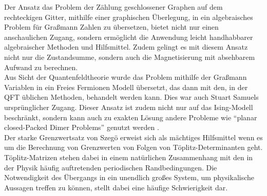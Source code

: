\noindent Der Ansatz das Problem der Zählung geschlossener Graphen auf dem rechteckigen Gitter, mithilfe einer graphischen Überlegung, in ein algebraisches Problem für Graßmann Zahlen zu übersetzen, bietet nicht nur einen anschaulichen Zugang, sondern ermöglicht die Anwendung leicht handhabbarer algebraischer Methoden und Hilfsmittel. Zudem gelingt es mit diesem Ansatz nicht nur die Zustandsumme, sondern auch die Magnetisierung mit absehbarem Aufwand zu berechnen. 
\\
Aus Sicht der Quantenfeldtheorie wurde das Problem mithilfe der Graßmann Variablen in ein Freies Fermionen Modell übersetzt, das dann mit den, in der QFT üblichen Methoden, behandelt werden kann. Dies war auch Stuart Samuels ursprünglicher Zugang. Dieser Ansatz ist zudem nicht nur auf das Ising-Modell beschränkt, sondern kann auch zu exakten Lösung andere Probleme wie ``planar closed-Packed Dimer Problems'' genutzt werden \cite{StuartSamuel1} \cite{StuartSamuel2}. \\ 
Der starke Grenzwertsatz von Szegö erweist sich als mächtiges Hilfsmittel wenn es um die Berechnung von Grenzwerten von Folgen von Töplitz-Determinanten geht. Töplitz-Matrizen stehen dabei in einem natürlichen Zusammenhang mit den in der Physik häufig auftretenden periodischen Randbedingungen. Die Notwendigkeit des Übergangs in ein unendlich großes System, um physikalische Aussagen treffen zu können, stellt dabei eine häufige Schwierigkeit dar.\\

